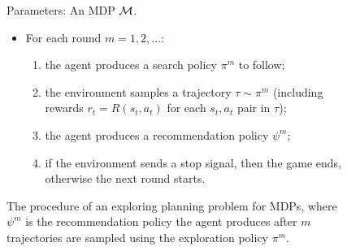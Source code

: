 
        \begin{figure}
            \begin{tcolorbox}
                Parameters: An MDP $\mathcal{M}$.
                \begin{itemize}
                    \item For each round $m=1,2,...$:
                    \begin{enumerate}
                        \item the agent produces a search policy $\pi^m$ to follow;
                        \item the environment samples a trajectory $\tau\sim\pi^m$ (including rewards $r_t=R(s_t,a_t)$ for each $s_t,a_t$ pair in $\tau$);
                        \item the agent produces a recommendation policy $\psi^m$;
                        \item if the environment sends a stop signal, then the game ends, otherwise the next round starts.
                    \end{enumerate} 
                \end{itemize}
            \end{tcolorbox}
            \caption[The procedure of an exploring planning problem for MDPs]{The procedure of an exploring planning problem for MDPs, where $\psi^m$ is the recommendation policy the agent produces after $m$ trajectories are sampled using the exploration policy $\pi^m$.}
            \label{fig:4:planning_problem}
        \end{figure}

